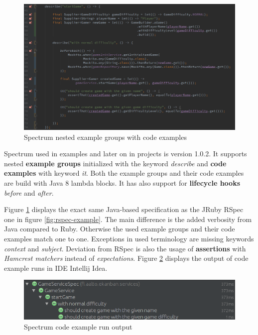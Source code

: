     \begin{figure}[ht]
      \begin{center}
        \includegraphics[width=13.7cm]{images/spectrum-example.png}
        \caption{Spectrum nested example groups with code examples}
        \label{fig:spectrum-example}
      \end{center}
    \end{figure}

    \restoregeometry

    Spectrum used in examples and later on in projects is version 1.0.2. It supports nested \textbf{example groups} initialized
    with the keyword \textit{describe} and \textbf{code examples} with keyword \textit{it}. Both the example groups and their code
    examples are build with Java 8 lambda blocks. It has also support for \textbf{lifecycle hooks} \textit{before} and \textit{after}. ~\cite{spectrum-102}

    Figure \ref{fig:spectrum-example} displays the exact same Java-based specification as the JRuby RSpec one in figure \ref{fig:rspec-example}.
    The main difference is the added verbosity from Java compared to Ruby. Otherwise the used example groups and their code examples
    match one to one. Exceptions in used terminology are missing keywords \textit{context} and \textit{subject}.
    Deviation from RSpec is also the usage of \textbf{assertions} with \textit{Hamcrest matchers} instead of \textit{expectations}.
    Figure \ref{fig:spectrum-result}
    displays the output of code example runs in IDE Intellij Idea.


    \begin{figure}[ht]
      \begin{center}
        \includegraphics[width=13.7cm]{images/spectrum-result.png}
        \caption{Spectrum code example run output}
        \label{fig:spectrum-result}
      \end{center}
    \end{figure}

